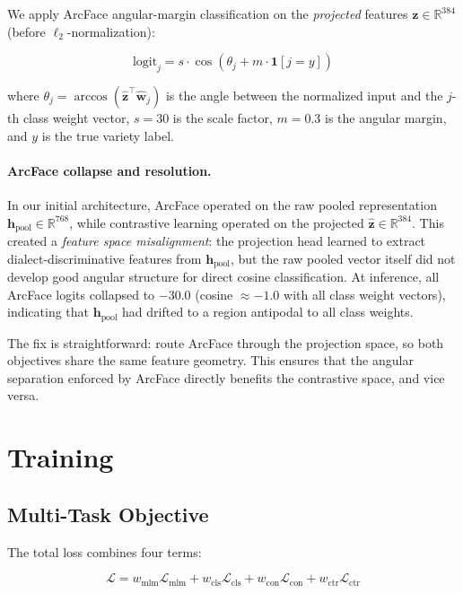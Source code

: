 \documentclass[11pt,a4paper]{article}
\newcommand{\RR}{\mathbb{R}}
\begin{document}
We apply ArcFace angular-margin classification on the \emph{projected}
features $\mathbf{z} \in \RR^{384}$ (before $\ell_2$-normalization):

\begin{equation}
    \text{logit}_j = s \cdot \cos(\theta_j + m \cdot \mathbf{1}[j = y])
    \label{eq:arcface}
\end{equation}

where $\theta_j = \arccos(\hat{\mathbf{z}}^\top \hat{\mathbf{w}}_j)$ is the
angle between the normalized input and the $j$-th class weight vector,
$s = 30$ is the scale factor, $m = 0.3$ is the angular margin, and $y$ is
the true variety label.

\paragraph{ArcFace collapse and resolution.}
In our initial architecture, ArcFace operated on the raw pooled representation
$\mathbf{h}_{\text{pool}} \in \RR^{768}$, while contrastive learning operated
on the projected $\hat{\mathbf{z}} \in \RR^{384}$. This created a
\emph{feature space misalignment}: the projection head learned to extract
dialect-discriminative features from $\mathbf{h}_{\text{pool}}$, but the raw
pooled vector itself did not develop good angular structure for direct cosine
classification. At inference, all ArcFace logits collapsed to $-30.0$
(cosine $\approx -1.0$ with all class weight vectors), indicating that
$\mathbf{h}_{\text{pool}}$ had drifted to a region antipodal to all class
weights.

The fix is straightforward: route ArcFace through the projection space, so
both objectives share the same feature geometry. This ensures that the angular
separation enforced by ArcFace directly benefits the contrastive space, and
vice versa.

\section{Training}

\subsection{Multi-Task Objective}

The total loss combines four terms:

\begin{equation}
    \mathcal{L} = w_{\text{mlm}} \mathcal{L}_{\text{mlm}}
    + w_{\text{cls}} \mathcal{L}_{\text{cls}}
    + w_{\text{con}} \mathcal{L}_{\text{con}}
    + w_{\text{ctr}} \mathcal{L}_{\text{ctr}}
\end{equation}
\end{document}
